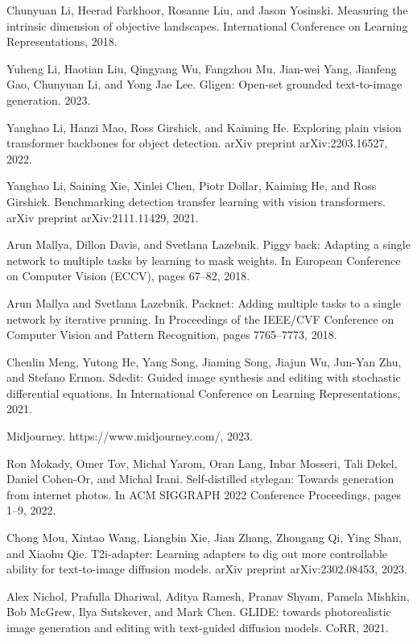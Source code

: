 \documentclass[a4paper,AutoFakeBold,oneside,12pt]{book}
\begin{document}
\begin{nopagenumber}
\noindent
[47] Chunyuan Li, Heerad Farkhoor, Rosanne Liu, and Jason Yosinski. Measuring the intrinsic dimension of objective landscapes. International Conference on Learning Representations, 2018.

\noindent
[48] Yuheng Li, Haotian Liu, Qingyang Wu, Fangzhou Mu, Jian-wei Yang, Jianfeng Gao, Chunyuan Li, and Yong Jae Lee. Gligen: Open-set grounded text-to-image generation. 2023.

\noindent
[49] Yanghao Li, Hanzi Mao, Ross Girshick, and Kaiming He. Exploring plain vision transformer backbones for object detection. arXiv preprint arXiv:2203.16527, 2022.

\noindent
[50] Yanghao Li, Saining Xie, Xinlei Chen, Piotr Dollar, Kaiming He, and Ross Girshick. Benchmarking detection transfer learning with vision transformers. arXiv preprint arXiv:2111.11429, 2021.

\noindent
[51] Arun Mallya, Dillon Davis, and Svetlana Lazebnik. Piggy back: Adapting a single network to multiple tasks by learning to mask weights. In European Conference on Computer Vision (ECCV), pages 67–82, 2018.

\noindent
[52] Arun Mallya and Svetlana Lazebnik. Packnet: Adding multiple tasks to a single network by iterative pruning. In Proceedings of the IEEE/CVF Conference on Computer Vision and Pattern Recognition, pages 7765–7773, 2018.

\noindent
[53] Chenlin Meng, Yutong He, Yang Song, Jiaming Song, Jiajun Wu, Jun-Yan Zhu, and Stefano Ermon. Sdedit: Guided image synthesis and editing with stochastic differential equations. In International Conference on Learning Representations, 2021.

\noindent
[54] Midjourney. https://www.midjourney.com/, 2023.

\noindent
[55] Ron Mokady, Omer Tov, Michal Yarom, Oran Lang, Inbar Mosseri, Tali Dekel, Daniel Cohen-Or, and Michal Irani. Self-distilled stylegan: Towards generation from internet photos. In ACM SIGGRAPH 2022 Conference Proceedings, pages 1–9, 2022.

\noindent
[56] Chong Mou, Xintao Wang, Liangbin Xie, Jian Zhang, Zhongang Qi, Ying Shan, and Xiaohu Qie. T2i-adapter: Learning adapters to dig out more controllable ability for text-to-image diffusion models. arXiv preprint arXiv:2302.08453, 2023.

\noindent
[57] Alex Nichol, Prafulla Dhariwal, Aditya Ramesh, Pranav Shyam, Pamela Mishkin, Bob McGrew, Ilya Sutskever, and Mark Chen. GLIDE: towards photorealistic image generation and editing with text-guided diffusion models. CoRR, 2021.


\end{nopagenumber}
\end{document}
